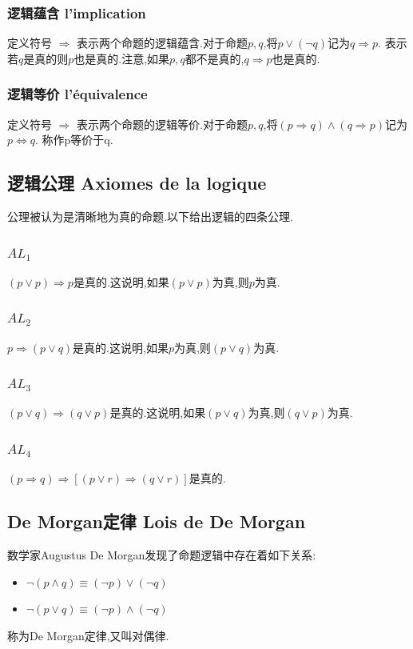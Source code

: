 \documentclass[12pt, a4paper, oneside]{ctexbook}
\begin{document}
  \subsubsection{逻辑蕴含 l'implication}
  定义符号 $\Rightarrow$ 表示两个命题的逻辑蕴含.对于命题$p,q$,将$p\lor(\lnot q)$记为$q\Rightarrow p$.
  表示若$q$是真的则$p$也是真的.注意,如果$p,q$都不是真的,$q\Rightarrow p$也是真的.
  \subsubsection{逻辑等价 l'équivalence}
  定义符号 $\Rightarrow$ 表示两个命题的逻辑等价.对于命题$p,q$,将$(p\Rightarrow q)\land (q\Rightarrow p)$记为$p\Leftrightarrow q$.
  称作p等价于q.
  \subsection{逻辑公理 Axiomes de la logique}
  公理被认为是清晰地为真的命题.以下给出逻辑的四条公理.
  \subsubsection{$AL_1$}
  $(p\lor p)\Rightarrow p$是真的.这说明,如果$(p\lor p)$为真,则$p$为真.
  \subsubsection{$AL_2$}
  $p\Rightarrow (p\lor q)$是真的.这说明,如果$p$为真,则$(p\lor q)$为真.
  \subsubsection{$AL_3$}
  $(p\lor q)\Rightarrow (q\lor p)$是真的.这说明,如果$(p\lor q)$为真,则$(q\lor p)$为真.
  \subsubsection{$AL_4$}
  $(p\Rightarrow q)\Rightarrow [(p\lor r)\Rightarrow(q\lor r)]$是真的.
  \subsection{De Morgan定律 Lois de De Morgan}
  数学家Augustus De Morgan发现了命题逻辑中存在着如下关系:
  \begin{itemize}
    \item $\lnot (p\wedge q)\equiv (\lnot p)\vee (\lnot q) $
    \item $\lnot (p\vee q)\equiv (\lnot p)\wedge (\lnot q) $
  \end{itemize}称为De Morgan定律,又叫对偶律.
\end{document}
